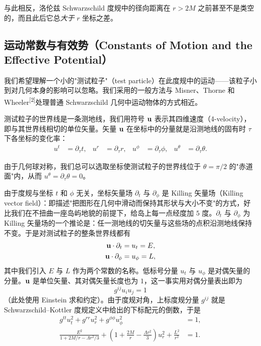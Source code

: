 与此相反，洛伦兹 Schwarzschild 度规中的径向距离在 $r>2M$ 之前甚至不是类空的，而且此后它总\emph{大于} $r$ 坐标之差。

\subsection{运动常数与有效势（Constants of Motion and the Effective Potential）}

我们希望理解一个小的"测试粒子"（test particle）在此度规中的运动——该粒子小到对几何本身的影响可以忽略。我们采用的一般方法与 Misner、Thorne 和 Wheeler\textsuperscript{[2]}处理普通 Schwarzschild 几何中运动物体的方式相近。

测试粒子的世界线是一条测地线，我们用符号 $\mathbf{u}$ 表示其四维速度（4-velocity），即与其世界线相切的单位矢量。矢量 $\mathbf{u}$ 在坐标中的分量就是沿测地线的固有时 $\tau$ 下各坐标的变化率：
\begin{align*}
u^{t} &= \partial_{\tau} t, &
u^{r} &= \partial_{\tau} r, &
u^{\phi} &= \partial_{\tau} \phi, &
u^{\theta} &= \partial_{\tau} \theta.
\end{align*}

由于几何球对称，我们总可以选取坐标使测试粒子的世界线位于 $\theta=\pi/2$ 的"赤道面"内，从而 $u^{\theta}=\partial_{\tau}\theta=0$。

由于度规与坐标 $t$ 和 $\phi$ 无关，坐标矢量场 $\partial_{t}$ 与 $\partial_{\phi}$ 是 Killing 矢量场（Killing vector field）：即描述"把图形在几何中滑动而保持其形状与大小不变"的方式，好比我们在不扭曲一座岛屿地貌的前提下，给岛上每一点经度加 $5$ 度。$\partial_{t}$ 与 $\partial_{\phi}$ 为 Killing 矢量场的一个推论是：任一测地线的切矢量与这些场的点积沿测地线保持不变。于是对测试粒子的整条世界线都有
\begin{align*}
\mathbf{u}\cdot\partial_{t} &= u_{t}=E, \\
\mathbf{u}\cdot\partial_{\phi} &= u_{\phi}=L,
\end{align*}
其中我们引入 $E$ 与 $L$ 作为两个常数的名称。低标号分量 $u_{t}$ 与 $u_{\phi}$ 是对偶矢量的分量。$\mathbf{u}$ 是单位矢量、其对偶矢量长度也为 $1$，这一事实用对偶分量表出即为
\begin{equation*}
g^{ij}u_{i}u_{j}=1
\end{equation*}
（此处使用 Einstein 求和约定）。由于度规对角，上标度规分量 $g^{ij}$ 就是 Schwarzschild--Kottler 度规定义中给出的下标配元的倒数，于是
\begin{align*}
g^{tt}u_{t}^{2}+g^{rr}u_{r}^{2}+g^{\phi\phi}u_{\phi}^{2} &= 1,\\
\frac{E^{2}}{1+2M/r-\Lambda r^{2}/3}+\left(1+\frac{2M}{r}-\frac{\Lambda r^{2}}{3}\right)u_{r}^{2}+\frac{L^{2}}{r^{2}} &= 1.
\end{align*}

